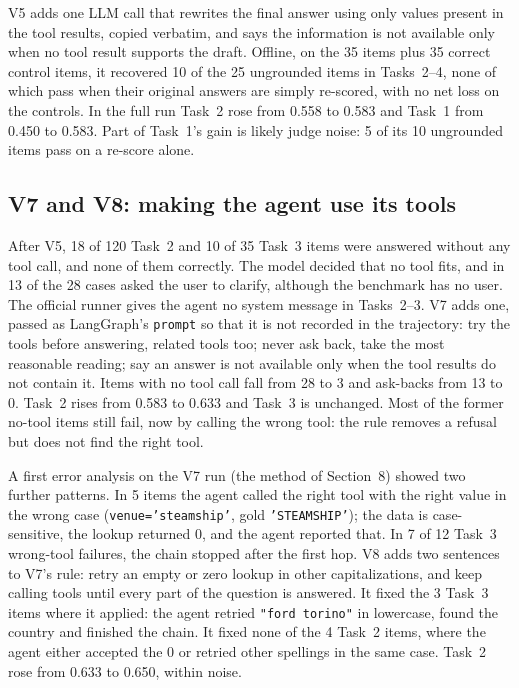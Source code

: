 \documentclass[10pt]{article}
\begin{document}
V5 adds one LLM call that rewrites the final answer using only values present in the tool
results, copied verbatim, and says the information is not available only when no tool result
supports the draft. Offline, on the 35 items plus 35 correct control items, it recovered 10 of
the 25 ungrounded items in Tasks~2--4, none of which pass when their original answers are simply
re-scored, with no net loss on the controls. In the full run Task~2 rose from 0.558 to 0.583 and
Task~1 from 0.450 to 0.583. Part of Task~1's gain is likely judge noise: 5 of its 10 ungrounded
items pass on a re-score alone.

\subsection*{V7 and V8: making the agent use its tools}
After V5, 18 of 120 Task~2 and 10 of 35 Task~3 items were answered without any tool call, and
none of them correctly. The model decided that no tool fits, and in 13 of the 28 cases asked the
user to clarify, although the benchmark has no user. The official runner gives the agent no
system message in Tasks~2--3. V7 adds one, passed as LangGraph's \texttt{prompt} so that it is
not recorded in the trajectory: try the tools before answering, related tools too; never ask
back, take the most reasonable reading; say an answer is not available only when the tool
results do not contain it. Items with no tool call fall from 28 to 3 and ask-backs from 13 to 0.
Task~2 rises from 0.583 to 0.633 and Task~3 is unchanged. Most of the former no-tool items still
fail, now by calling the wrong tool: the rule removes a refusal but does not find the right tool.

A first error analysis on the V7 run (the method of Section~8) showed two further patterns. In 5 items the agent called the
right tool with the right value in the wrong case (\texttt{venue='steamship'}, gold
\texttt{'STEAMSHIP'}); the data is case-sensitive, the lookup returned 0, and the agent reported
that. In 7 of 12 Task~3 wrong-tool failures, the chain stopped after the first hop. V8 adds two
sentences to V7's rule: retry an empty or zero lookup in other capitalizations, and keep calling
tools until every part of the question is answered. It fixed the 3 Task~3 items where it applied:
the agent retried \texttt{"ford torino"} in lowercase, found the country and finished the chain.
It fixed none of the 4 Task~2 items, where the agent either accepted the 0 or retried other
spellings in the same case. Task~2 rose from 0.633 to 0.650, within noise.
\end{document}
